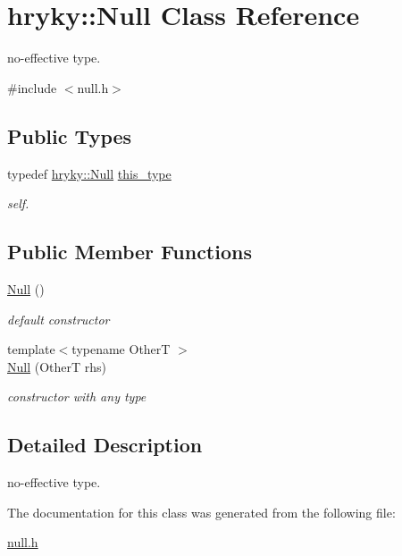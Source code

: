 \hypertarget{classhryky_1_1_null}{\section{hryky\-:\-:Null Class Reference}
\label{classhryky_1_1_null}
}


no-\/effective type.  




{\ttfamily \#include $<$null.\-h$>$}

\subsection*{Public Types}
\begin{DoxyCompactItemize}
\item 
\hypertarget{classhryky_1_1_null_a07f3ec268976dc8a2eaa66e61861c282}{typedef \hyperlink{classhryky_1_1_null}{hryky\-::\-Null} \hyperlink{classhryky_1_1_null_a07f3ec268976dc8a2eaa66e61861c282}{this\-\_\-type}}\label{classhryky_1_1_null_a07f3ec268976dc8a2eaa66e61861c282}

\begin{DoxyCompactList}\small\item\em self. \end{DoxyCompactList}\end{DoxyCompactItemize}
\subsection*{Public Member Functions}
\begin{DoxyCompactItemize}
\item 
\hypertarget{classhryky_1_1_null_a6c119aabf95e6cf5dfec276693a6653d}{\hyperlink{classhryky_1_1_null_a6c119aabf95e6cf5dfec276693a6653d}{Null} ()}\label{classhryky_1_1_null_a6c119aabf95e6cf5dfec276693a6653d}

\begin{DoxyCompactList}\small\item\em default constructor \end{DoxyCompactList}\item 
\hypertarget{classhryky_1_1_null_a7dff7853c19d89bb009bd2849640fde6}{{\footnotesize template$<$typename Other\-T $>$ }\\\hyperlink{classhryky_1_1_null_a7dff7853c19d89bb009bd2849640fde6}{Null} (Other\-T rhs)}\label{classhryky_1_1_null_a7dff7853c19d89bb009bd2849640fde6}

\begin{DoxyCompactList}\small\item\em constructor with any type \end{DoxyCompactList}\end{DoxyCompactItemize}


\subsection{Detailed Description}
no-\/effective type. 

The documentation for this class was generated from the following file\-:\begin{DoxyCompactItemize}
\item 
\hyperlink{null_8h}{null.\-h}\end{DoxyCompactItemize}
